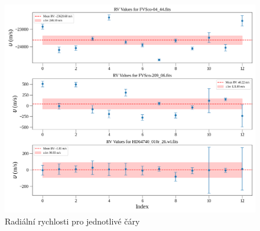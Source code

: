 \documentclass[a4paper,11pt,twocolumn]{article}
\begin{document}
    \begin{figure}
        \centering
        \includegraphics[width=1\textwidth]{rv_values.png}
        \caption{Radiální rychlosti pro jednotlivé čáry}
        \label{fig:rv_values}
    \end{figure}
\end{document}
